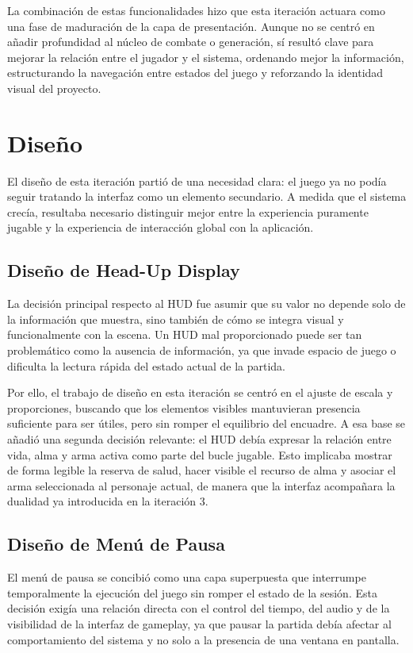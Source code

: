 La combinación de estas funcionalidades hizo que esta iteración actuara como una fase de
maduración de la capa de presentación. Aunque no se centró en añadir profundidad al núcleo
de combate o generación, sí resultó clave para mejorar la relación entre el jugador y el
sistema, ordenando mejor la información, estructurando la navegación entre estados del
juego y reforzando la identidad visual del proyecto.

\section{Diseño}
El diseño de esta iteración partió de una necesidad clara: el juego ya no podía seguir
tratando la interfaz como un elemento secundario. A medida que el sistema crecía, resultaba
necesario distinguir mejor entre la experiencia puramente jugable y la experiencia de
interacción global con la aplicación.

\subsection{Diseño de Head-Up Display}
La decisión principal respecto al HUD fue asumir que su valor no depende solo de la
información que muestra, sino también de cómo se integra visual y funcionalmente con la
escena. Un HUD mal proporcionado puede ser tan problemático como la ausencia de información,
ya que invade espacio de juego o dificulta la lectura rápida del estado actual de la partida.

Por ello, el trabajo de diseño en esta iteración se centró en el ajuste de escala y
proporciones, buscando que los elementos visibles mantuvieran presencia suficiente para ser
útiles, pero sin romper el equilibrio del encuadre. A esa base se añadió una segunda decisión
relevante: el HUD debía expresar la relación entre vida, alma y arma activa como parte del
bucle jugable. Esto implicaba mostrar de forma legible la reserva de salud, hacer visible el
recurso de alma y asociar el arma seleccionada al personaje actual, de manera que la
interfaz acompañara la dualidad ya introducida en la iteración 3.

\subsection{Diseño de Menú de Pausa}
El menú de pausa se concibió como una capa superpuesta que interrumpe temporalmente la
ejecución del juego sin romper el estado de la sesión. Esta decisión exigía una relación
directa con el control del tiempo, del audio y de la visibilidad de la interfaz de
gameplay, ya que pausar la partida debía afectar al comportamiento del sistema y no solo a
la presencia de una ventana en pantalla.

